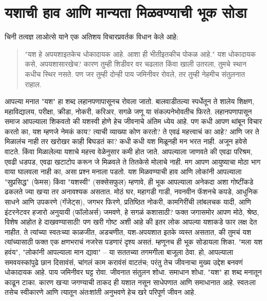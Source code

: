  \chapter{यशाची हाव आणि मान्यता मिळवण्याची भूक सोडा}
चिनी तत्वज्ञ लाओत्से याने एक अतिशय विचारप्रवर्तक विधान केले आहे:
\begin{quote}
 "यश हे अपयशाइतकेच धोकादायक आहे.
 आशा ही भीतीइतकीच पोकळ आहे."
यश धोकादायक कसे, अपयशासारखेच?
 कारण तुम्ही शिडीवर वर चढलात किंवा खाली उतरला,
 तुमचे स्थान कधीच स्थिर नसते.
 पण जर तुम्ही दोन्ही पाय जमिनीवर रोवले,
 तर तुम्ही नेहमीच संतुलनात राहाल.
 \end{quote}
आपल्या मनात "यश" हा शब्द लहानपणापासूनच रोवला जातो. बालवाडीतल्या स्पर्धेतून ते शालेय शिक्षण, महाविद्यालय, परीक्षा, क्रीडा, नोकरी, करिअर, सगळे जणू या संकल्पनेभोवतीच फिरते. लहानपणापासून समाज आपल्याला शिकवतो की यशस्वी होणे हेच जीवनाचे अंतिम ध्येय आहे. पण कधी आपण थांबून विचार करतो का, यश म्हणजे नेमकं काय? त्याची व्याख्या कोण करतो? ते एवढं महत्त्वाचं का आहे? आणि जर ते मिळालंच नाही तर खरोखर काही बिघडतं का?
कधी कधी यश मिळूनही मन भरत नाही. अजून हवेसे वाटते. किंवा मिळालेल्या यशाचे महत्त्व वेळेनुसार कमी होत जाते. आपल्याला जाणवते की एवढा परिश्रम, एवढी धडपड, एवढा खटाटोप करून जे मिळवले ते तितकेसे मोलाचे नाही. मग आपण आयुष्याचा मोठा भाग वाया घालवला नाही का, असा प्रश्न मनाला पडतो.
यश मिळवण्याची हाव आणि लोकांनी आपल्याला "सुप्रसिद्ध" (फेमस) किंवा "यशस्वी" (सक्सेसफुल) म्हणावे, ही भूक आपल्याला अनेकदा अशा गोष्टींकडे ढकलते ज्या खऱ्या तर अनावश्यक असतात. मोठं घर, महागडी गाडी, नवनवीन फॅशनचे कपडे, आधुनिक साधने आणि उपकरणे (गॅजेट्स), जगभर फिरणे, प्रतिष्ठित नोकरी, कामगिरींची लांबलचक यादी, आणि इंटरनेटवर हजारो अनुयायी (फॉलोअर्स) जमवणे, हे सगळं कशासाठी? फक्त जगासमोर आपण मोठे, श्रेष्ठ, विशेष आहोत हे दाखवण्यासाठी!
पण खरी गोष्ट अशी आहे की इतर लोक आपल्या यशाकडे फार लक्ष देत नाहीत. ते त्यांच्या स्वतःच्या काळजीत, अडचणीत, यश-अपयशात इतके व्यस्त असतात, की तुमचं यश त्यांच्यासाठी फक्त एक क्षणभराचं नजरेस पडणारं दृश्य असतं.
म्हणूनच ही भूक सोडायला शिका. "मला यश हवंय", "लोकांनी आपल्याला मान द्यावा" – या सततच्या तगमगीला बाजूला ठेवा. हो, आपल्याला समवयस्कांपुढे छान दिसावंसं, चांगलं काम करावंसं वाटतंच; परंतु तेच जीवनाचा मुख्य उद्देश बनवणं धोकादायक आहे.
पाय जमिनीवर घट्ट रोवा. जीवनात संतुलन शोधा. समाधान शोधा. "यश" हा शब्द मनातून काढून टाका. कारण खऱ्या जगण्याची ताकद ही यशात नसून साधेपणात आणि समाधानात आहे. स्वतःला तसेच स्वीकारणे आणि त्यातून अंतःशांती अनुभवणे हेच खरे परिपूर्ण जीवन आहे.


